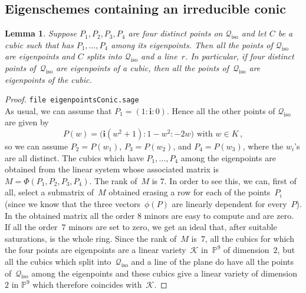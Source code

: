 \documentclass{amsart}
\theoremstyle{plain}
\newtheorem{lemma}{Lemma}[section]
\theoremstyle{definition}
\newcommand{\p}{\mathbb{P}}
\newcommand{\iso}{\mathcal{Q}_{\mathrm{iso}}}
\newcommand{\iii}{\textbf{i}}
\begin{document}
\subsection{Eigenschemes containing an irreducible conic}
\begin{lemma}
\label{lemma:fourOnIso}
Suppose $P_1, P_2, P_3, P_4$ are four distinct points on $\iso$ and let
$C$ be a cubic such that has $P_1, \dots, P_4$ among its eigenpoints.
Then all the points of $\iso$ are eigenpoints and $C$ splits into $\iso$
and a line~$r$. In particular, if four
distinct points of~$\iso$ are eigenpoints of a cubic, then all the
points of~$\iso$ are eigenpoints of the cubic.
\end{lemma}
\begin{proof}
\verb+file eigenpointsConic.sage+\\
As usual, we can assume that $P_1 = (1: \iii: 0)$. Hence all the other points
of $\iso$ are given by
%
\[
  P(w) = \bigl(\iii(w^2 + 1): 1 - w^2: -2w\bigr) \text{ with } w \in K \,,
\]
%
so we can assume
$P_2 = P(w_1)$, $P_3 = P(w_2)$, and $P_4 = P(w_3)$, where the $w_i$'s are
all distinct. The cubics which have $P_1, \dots, P_4$ among the eigenpoints
are obtained from the linear system whose associated matrix is
$M = \Phi(P_1, P_2, P_3, P_4)$. The rank of~$M$ is $7$. In order to see this,
we can, first of all, select a submatrix of~$M$ obtained erasing a
row for each of the points~$P_i$ (since we know that the three vectors~$\phi(P)$ are linearly dependent for every~$P$). In the obtained matrix
all the order $8$ minors are easy to compute and are zero.
If all the order~$7$
minors are set to zero, we get an ideal that, after suitable saturations,
is the whole ring. Since the rank of~$M$ is~$7$, all the cubics for which the
four points are eigenpoints are a linear variety~$\mathcal{K}$
in~$\p^9$
of dimension~$2$, but all the cubics which split into~$\iso$ and a line
of the plane do have all the points of~$\iso$ among the eigenpoints and
these cubics give a linear variety of dimension~$2$ in $\p^9$
which therefore coincides with~$\mathcal{K}$.
\end{proof}
\end{document}
